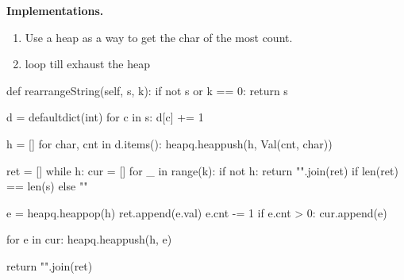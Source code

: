 \textbf{Implementations.}
\begin{enumerate}
\item Use a heap as a way to get the char of the most count. 
\item {} loop till exhaust the heap
\end{enumerate}

\begin{python}
def rearrangeString(self, s, k):
  if not s or k == 0: return s

  d = defaultdict(int)
  for c in s:
    d[c] += 1

  h = []
  for char, cnt in d.items():
    heapq.heappush(h, Val(cnt, char))

  ret = []
  while h:
    cur = []
    for _ in range(k):
      if not h: 
        return "".join(ret) if len(ret) == len(s) else ""

      e = heapq.heappop(h)
      ret.append(e.val)
      e.cnt -= 1
      if e.cnt > 0:
        cur.append(e)

    for e in cur:
      heapq.heappush(h, e)

  return "".join(ret)

\end{python}

